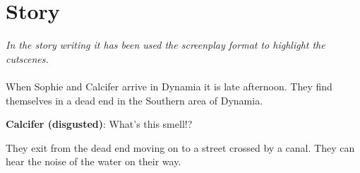 \section{Story}

\textit{In the story writing it has been used the screenplay format to highlight the cutscenes.}\\\\

When Sophie and Calcifer arrive in Dynamia it is late afternoon. They find themselves in a dead end in the Southern area of Dynamia.

\textbf{Calcifer (disgusted)}: What's this smell!?

They exit from the dead end moving on to a street crossed by a canal. They can hear the noise of the water on their way.

